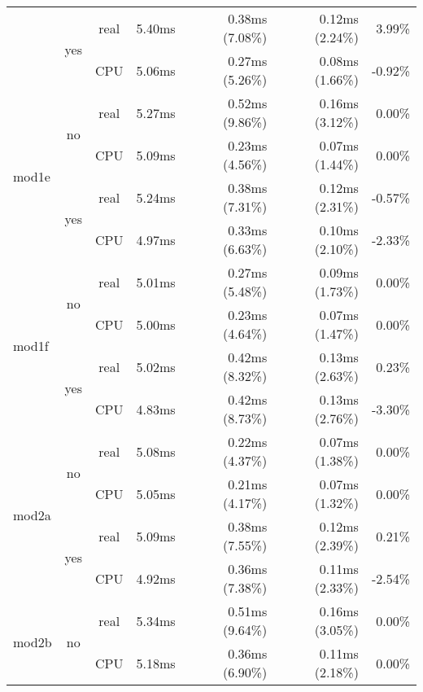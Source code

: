 \documentclass[en]{pracamgr}
\begin{document}
\begin{small}
\begin{longtable}{|l|c|c|r|r|r|r|}
                          \cline{2-7}
                          & \multirow{2}{*}{yes} & real & 5.40ms & 0.38ms (7.08\%) & 0.12ms (2.24\%) & 3.99\% \\*
                          &                      & CPU  & 5.06ms & 0.27ms (5.26\%) & 0.08ms (1.66\%) & -0.92\% \\
\hline
\multirow{4}{*}{mod1e}    & \multirow{2}{*}{no}  & real & 5.27ms & 0.52ms (9.86\%) & 0.16ms (3.12\%) & 0.00\% \\*
                          &                      & CPU  & 5.09ms & 0.23ms (4.56\%) & 0.07ms (1.44\%) & 0.00\% \\*
                          \cline{2-7}
                          & \multirow{2}{*}{yes} & real & 5.24ms & 0.38ms (7.31\%) & 0.12ms (2.31\%) & -0.57\% \\*
                          &                      & CPU  & 4.97ms & 0.33ms (6.63\%) & 0.10ms (2.10\%) & -2.33\% \\
\hline
\multirow{4}{*}{mod1f}    & \multirow{2}{*}{no}  & real & 5.01ms & 0.27ms (5.48\%) & 0.09ms (1.73\%) & 0.00\% \\*
                          &                      & CPU  & 5.00ms & 0.23ms (4.64\%) & 0.07ms (1.47\%) & 0.00\% \\*
                          \cline{2-7}
                          & \multirow{2}{*}{yes} & real & 5.02ms & 0.42ms (8.32\%) & 0.13ms (2.63\%) & 0.23\% \\*
                          &                      & CPU  & 4.83ms & 0.42ms (8.73\%) & 0.13ms (2.76\%) & -3.30\% \\
\hline
\multirow{4}{*}{mod2a}    & \multirow{2}{*}{no}  & real & 5.08ms & 0.22ms (4.37\%) & 0.07ms (1.38\%) & 0.00\% \\*
                          &                      & CPU  & 5.05ms & 0.21ms (4.17\%) & 0.07ms (1.32\%) & 0.00\% \\*
                          \cline{2-7}
                          & \multirow{2}{*}{yes} & real & 5.09ms & 0.38ms (7.55\%) & 0.12ms (2.39\%) & 0.21\% \\*
                          &                      & CPU  & 4.92ms & 0.36ms (7.38\%) & 0.11ms (2.33\%) & -2.54\% \\
\hline
\multirow{4}{*}{mod2b}    & \multirow{2}{*}{no}  & real & 5.34ms & 0.51ms (9.64\%) & 0.16ms (3.05\%) & 0.00\% \\*
                          &                      & CPU  & 5.18ms & 0.36ms (6.90\%) & 0.11ms (2.18\%) & 0.00\% \\*

\end{longtable}
\end{small}
\end{document}
